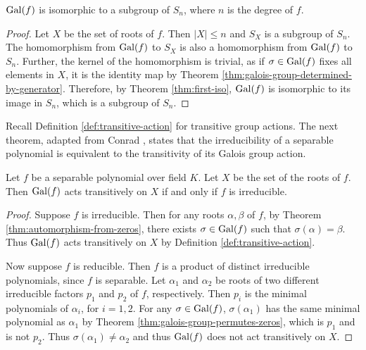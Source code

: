\begin{corollary} \label{thm:galois-group-isomorphic-symmetric-subgroup}
	$\operatorname{Gal}(f)$ is isomorphic to a subgroup of $S_n$, where $n$ is the degree of $f$. 
\end{corollary}

\begin{proof}
	Let $X$ be the set of roots of $f$. Then $|X| \le n$ and $S_X$ is a subgroup of $S_n$. The homomorphism from $\operatorname{Gal}(f)$ to $S_X$ is also a homomorphism from $\operatorname{Gal}(f)$ to $S_n$. Further, the kernel of the homomorphism is trivial, as if $\sigma \in \operatorname{Gal}(f)$ fixes all elements in $X$, it is the identity map by Theorem \ref{thm:galois-group-determined-by-generator}. Therefore, by Theorem \ref{thm:first-iso}, $\operatorname{Gal}(f)$ is isomorphic to its image in $S_n$, which is a subgroup of $S_n$. 
\end{proof}

Recall Definition \ref{def:transitive-action} for transitive group actions. The next theorem, adapted from Conrad \cite{galois-permutation}, states that the irreducibility of a separable polynomial is equivalent to the transitivity of its Galois group action.

\begin{theorem} \label{thm:galois-action-transitive-irreducible}
	Let $f$ be a separable polynomial over field $K$. Let $X$ be the set of the roots of $f$. Then $\operatorname{Gal}(f)$ acts transitively on $X$ if and only if $f$ is irreducible. 
\end{theorem}

\begin{proof}
	Suppose $f$ is irreducible. Then for any roots $\alpha, \beta$ of $f$, by Theorem \ref{thm:automorphism-from-zeros}, there exists $\sigma \in \operatorname{Gal}(f)$ such that $\sigma(\alpha) = \beta$. Thus $\operatorname{Gal}(f)$ acts transitively on $X$ by Definition \ref{def:transitive-action}. 
	
	Now suppose $f$ is reducible. Then $f$ is a product of distinct irreducible polynomials, since $f$ is separable. Let $\alpha_1$ and $\alpha_2$ be roots of two different irreducible factors $p_1$ and $p_2$ of $f$, respectively. Then $p_i$ is the minimal polynomials of $\alpha_i$, for $i = 1, 2$. For any $\sigma \in \operatorname{Gal}(f)$, $\sigma(\alpha_1)$ has the same minimal polynomial as $\alpha_1$ by Theorem \ref{thm:galois-group-permutes-zeros}, which is $p_1$ and is not $p_2$. Thus $\sigma(\alpha_1) \neq \alpha_2$ and thus $\operatorname{Gal}(f)$ does not act transitively on $X$. 
\end{proof}

